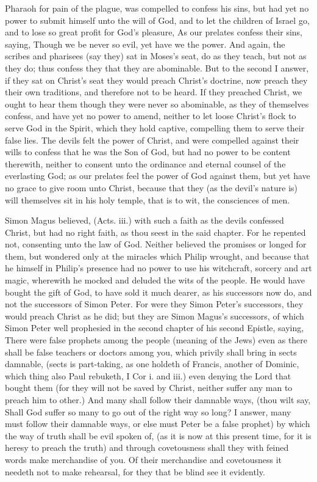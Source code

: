 Pharaoh for pain of the plague, was compelled to 
confess his sins, but had yet no power to submit himself
unto the will of God, and to let the children of Israel
go, and to lose so great profit for God's pleasure, As 
our prelates confess their sins, saying, Though we be never 
so evil, yet have we the power. And again, the scribes 
and pharisees (say they) sat in Moses's seat, do as they 
teach, but not as they do; thus confess they that they are 
abominable. But to the second I answer, if they sat on 
Christ's seat they would preach Christ's doctrine, now 
preach they their own traditions, and therefore not to be 
heard. If they preached Christ, we ought to hear them 
though they were never so abominable, as they of themselves
confess, and have yet no power to amend, neither 
to let loose Christ's flock to serve God in the Spirit, 
which they hold captive, compelling them to serve their 
false lies. The devils felt the power of Christ, and were 
compelled against their wills to confess that he was the 
Son of God, but had no power to be content therewith, 
neither to consent unto the ordinance and eternal counsel 
of the everlasting God; as our prelates feel the power 
of God against them, but yet have no grace to give room 
unto Christ, because that they (as the devil's nature is) 
will themselves sit in his holy temple, that is to wit, the 
consciences of men. 

Simon Magus believed, (Acts. iii.) with such a faith 
as the devils confessed Christ, but had no right faith, as 
thou seest in the said chapter. For he repented not, 
consenting unto the law of God. Neither believed the 
promises or longed for them, but wondered only at the miracles
which Philip wrought, and because that he himself 
in Philip's presence had no power to use his witchcraft, 
sorcery and art magic, wherewith he mocked and deluded 
the wits of the people. He would have bought the gift 
of God, to have sold it much dearer, as his successors 
now do, and not the successors of Simon Peter. For 
were they Simon Peter's successors, they would preach 
Christ as he did; but they are Simon Magus's successors, 
of which Simon Peter well prophesied in the second chapter 
of his second Epistle, saying, There were false prophets 
among the people (meaning of the Jews) even as there 
shall be false teachers or doctors among you, which privily 
shall bring in sects damnable, (sects is part-taking, as one 
holdeth of Francis, another of Dominic, which thing also 
Paul rebuketh, I Cor i. and iii.) even denying the Lord 
that bought them (for they will not be saved by Christ, 
neither suffer any man to preach him to other.) And 
many shall follow their damnable ways, (thou wilt say, 
Shall God suffer so many to go out of the right way so 
long? I answer, many must follow their damnable ways, 
or else must Peter be a false prophet) by which the way 
of truth shall be evil spoken of, (as it is now at this present 
time, for it is heresy to preach the truth) and through 
covetousness shall they with feined words make merchandise
of you. Of their merchandise and covetousness it needeth 
not to make rehearsal, for they that be blind see it evidently. 

